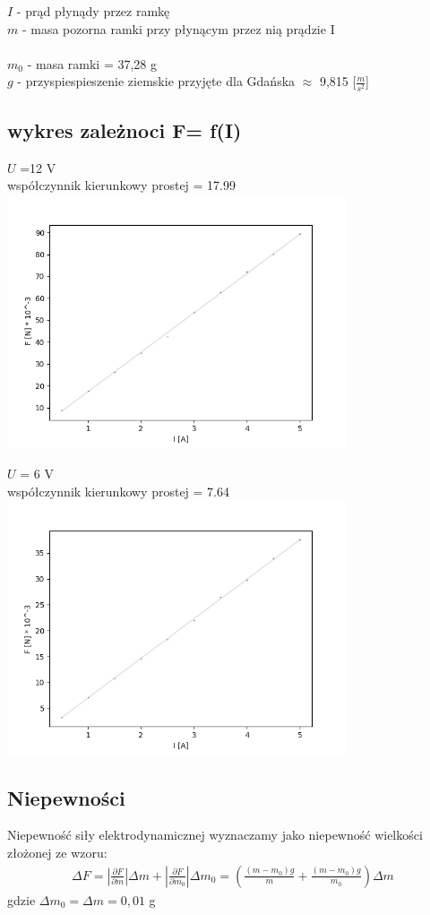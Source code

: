 \documentclass{article}
\begin{document}
$I$ - prąd płynądy przez ramkę \\
$m$ - masa pozorna ramki przy płynącym przez nią prądzie I \\\\
$m_0$ - masa ramki = 37,28 g\\
$g$ - przyspiespieszenie ziemskie przyjęte dla Gdańska $\approx$ 9,815 [$\frac{m}{s^2}$]

\subsection{wykres zależnoci F= f(I)}
$U$ =12 V\\
współczynnik kierunkowy prostej = 17.99\\
\includegraphics[width=10cm]{F(I)_12V}


$U$ = 6 V\\
współczynnik kierunkowy prostej = 7.64\\
\includegraphics[width=10cm]{F(I)_6V}


\subsection{Niepewności}
Niepewność siły elektrodynamicznej wyznaczamy jako niepewność wielkości złożonej ze wzoru:\\
\begin{gather*}
		\Delta F= |\frac{\partial F}{\partial m}| \Delta m + |\frac{\partial F}{\partial m_0}| \Delta m_0  = (\frac{(m - m_0)g }{m} + \frac{(m - m_0)g }{m_0}) \Delta m
\end{gather*}
gdzie $\Delta m_0 =\Delta m = 0,01$ g
\end{document}
